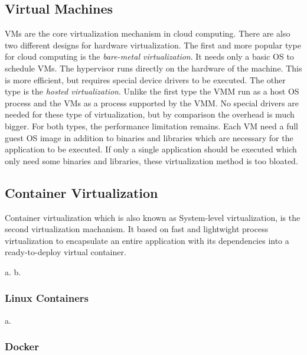\subsection{Virtual Machines}
\acp{VM} are the core virtualization mechanism in cloud computing.
There are also two different designs for hardware virtualization.
The first and more popular type for cloud computing is the \textit{bare-metal virtualization}.
It needs only a basic OS to schedule \acp{VM}.
The hypervisor runs directly on the hardware of the machine.
This is more efficient, but requires special device drivers to be executed.
The other type is the \textit{hosted virtualization}.
Unlike the first type the \ac{VMM} run as a host \ac{OS} process and the \acp{VM} as a process supported by the \ac{VMM}.
No special drivers are needed for these type of virtualization, but by comparison the overhead is much bigger.
For both types, the performance limitation remains.
Each \ac{VM} need a full guest \ac{OS} image in addition to binaries and libraries which are necessary for the application to be executed.\cite[cf.][p. 381]{Pahl2015}
If only a single application should be executed which only need some binaries and libraries, these virtualization method is too bloated.


\subsection{Container Virtualization}
Container virtualization which is also known as System-level virtualization, is the second virtualization machanism.
It based on fast and lightwight process virtualization to encapsulate an entire application with its dependencies into a ready-to-deploy virtual container.\cite[cf.][p. 72]{Tosatto:2015}

a.\cite{Celesti:2016}
b.\cite{Anderson:2016}


\subsubsection{Linux Containers}
a.\cite{Soltesz:2007}

\subsubsection{Docker}

